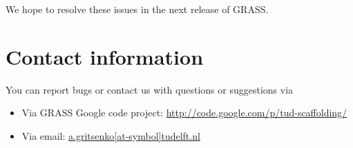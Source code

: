 \documentclass[12pt, a4paper]{report}
\begin{document}
We hope to resolve these issues in the next release of GRASS.

\section{Contact information}
You can report bugs or contact us with questions or suggestions via
\begin{itemize}
\item Via GRASS Google code project: \url{http://code.google.com/p/tud-scaffolding/}
\item Via email: \href{mailto:a.girtsenko@tudelft.nl?subject=GRASS}{a.gritsenko[at-symbol]tudelft.nl}
\end{itemize}
\end{document}
